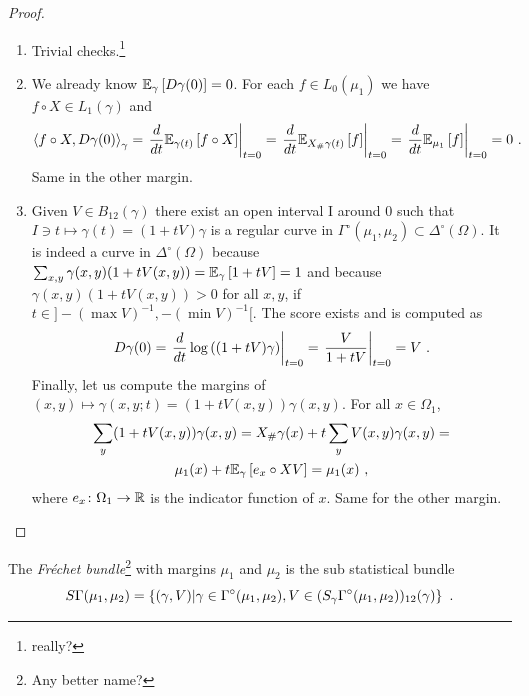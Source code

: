 \documentclass[12pt,a4paper]{amsart}
\begin{document}
\begin{proof} \ 
  \begin{enumerate}
  \item Trivial checks.\footnote{really?}
  \item We already know ${\operatorname{\mathbb E}}_{\gamma}\left[D\gamma(0)\right] = 0$. For each $f \in L_0(\mu_1)$ we have $f \circ X \in L_1(\gamma)$ and 
%
    \begin{equation*}
    \left\langle f \circ X , D\gamma(0) \right\rangle_{\gamma} = \left. \frac{d}{dt} {\operatorname{\mathbb E}}_{\gamma(t)}\left[f \circ X\right] \right|_{t=0} = \left. \frac{d}{dt} {\operatorname{\mathbb E}}_{X_{\#}\gamma(t)}\left[f\right] \right|_{t=0} = \left. \frac{d}{dt} {\operatorname{\mathbb E}}_{\mu_1}\left[f\right] \right|_{t=0} = 0 \ .
    \end{equation*}
%
Same in the other margin.
  \item Given $V \in B_{12}(\gamma)$ there exist an open interval I around 0 such that $I \ni t \mapsto \gamma(t) = (1+tV)\gamma$ is a regular curve in $\Gamma^\circ(\mu_1,\mu_2) \subset \Delta^\circ(\Omega)$. It is indeed a curve in $\Delta^\circ(\Omega)$ because $\sum_{x,y} \gamma(x,y)(1+tV(x,y)) = {\operatorname{\mathbb E}}_{\gamma}\left[1+tV\right] = 1$ and because $\gamma(x,y)(1+tV(x,y)) > 0$ for all $x,y$, if $t \in ]- (\max V)^{-1}, - (\min V)^{-1}[$.  The score exists and is computed as
%
\    \begin{equation*}
     D\gamma(0) = \left.  \frac{d}{dt} \log\left( (1+tV)\gamma \right) \right|_{t=0} = \left. \frac V {1+tV} \right|_{t=0} = V \ .
    \end{equation*}
%
Finally, let us compute the margins of $(x,y) \mapsto \gamma(x,y;t) = (1+tV(x,y))\gamma(x,y)$. For all $x \in \Omega_1$,
%
\begin{multline*}
  \sum_y (1+tV(x,y))\gamma(x,y) = X_\# \gamma(x) + t \sum_y V(x,y)\gamma(x,y) = \\ \mu_1(x) + t {\operatorname{\mathbb E}}_{\gamma}\left[e_x\circ X V\right] = \mu_1(x) \ ,
\end{multline*}
%
where $e_x \colon \Omega_1 \to \mathbb R$ is the indicator function of $x$. Same for the other margin.
  \end{enumerate}
\end{proof}
%
\begin{definition}
The \emph{Fr\'echet bundle}\footnote{Any better name?} with margins $\mu_1$ and $\mu_2$ is the sub statistical bundle
%
\begin{equation*}
  S\Gamma(\mu_1,\mu_2) = \left\{ (\gamma,V) \middle| \gamma\in\Gamma^\circ(\mu_1,\mu_2),V \in (S_\gamma\Gamma^\circ(\mu_1,\mu_2))_{12}(\gamma) \right\} \ .
\end{equation*}
\end{definition}
\end{document}
